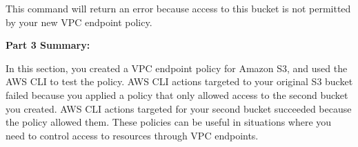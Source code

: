 This command will return an error because access to this bucket is not
permitted by your new VPC endpoint policy.

\vspace{0.5em}\noindent\textbf{Part 3 Summary:}\par

In this section, you created a VPC endpoint policy for Amazon S3, and
used the AWS CLI to test the policy. AWS CLI actions targeted to your
original S3 bucket failed because you applied a policy that only allowed
access to the second bucket you created. AWS CLI actions targeted for
your second bucket succeeded because the policy allowed them. These
policies can be useful in situations where you need to control access to
resources through VPC endpoints.
